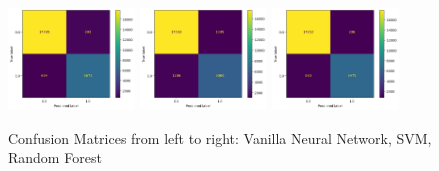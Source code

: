 \documentclass{article}
\begin{document}
\begin{figure}[hbp]
	\caption{Confusion Matrices from left to right: Vanilla Neural Network, SVM, Random Forest}
	\includegraphics[width=0.3\textwidth]{vnn_confusion_matrix.png}
	\includegraphics[width=0.3\textwidth]{svm_confusion_matrix.png}
	\includegraphics[width=0.3\textwidth]{rf_confusion_matrix.png}
\end{figure}
\end{document}
